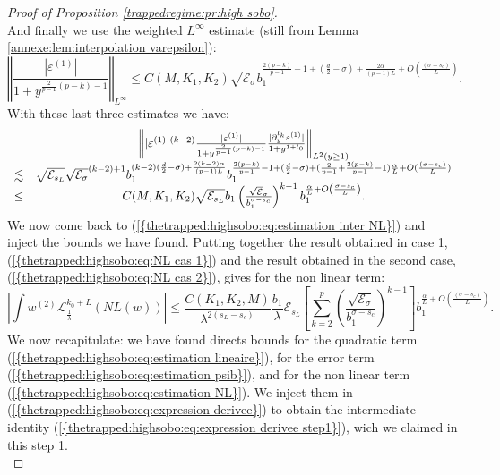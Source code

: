 \documentclass[11pt,a4paper,reqno]{amsart}
\theoremstyle{remark}
\numberwithin{equation}{section}
\begin{document}
\begin{proof}[Proof of Proposition \ref{trappedregime:pr:high sobo}]
$$$$
And finally we use the weighted $L^{\infty}$ estimate (still from Lemma \ref{annexe:lem:interpolation varepsilon}):
$$
\left\Vert \frac{|\varepsilon^{(1)}|}{1+y^{\frac{2}{p-1}(p-k)-1}} \right\Vert_{L^{\infty}}\leq C(M,K_1,K_2) \sqrt{\mathcal{E}_{\sigma}}b_1^{\frac{2(p-k)}{p-1}-1+(\frac{d}{2}-\sigma)+\frac{2\alpha}{(p-1)L}+ O(\frac{(\sigma-s_c)}{L})} .
$$
With these last three estimates we have:
\begin{equation} \label{thetrapped:highsobo:eq:NL cas 2}
\begin{array}{r c l}
&\left\Vert|\varepsilon^{(1)}|^{(k-2)}\frac{|\varepsilon^{(1)}|}{1+y^{\frac{2}{p-1}(p-k)-1}}  \frac{|\partial_y^{l_k}\varepsilon^{(1)}|}{1+y^{1+l_0}} \right\Vert_{L^2(y\geq 1)} \\
\lesssim & \sqrt{\mathcal{E}_{s_L}} \sqrt{\mathcal{E}_{\sigma}}^{(k-2)+1}b_1^{(k-2)(\frac{d}{2}-\sigma)+\frac{2(k-2)\alpha}{(p-1)L}} b_1^{\frac{2(p-k)}{p-1}-1+(\frac{d}{2}-\sigma)+(\frac{2}{p-1}+\frac{2(p-k)}{p-1}-1)\frac{\alpha}{L} +O(\frac{(\sigma-s_c)}{L})} \\
\leq& C(M,K_1,K_2) \sqrt{\mathcal{E}_{s_L}}b_1 \left( \frac{\sqrt{\mathcal{E}}_{\sigma}}{b_1^{\sigma-s_c}}\right)^{k-1}b_1^{\frac{\alpha}{L}+O\left(\frac{\sigma-s_c}{L}\right)} .
\end{array}
\end{equation}
We now come back to {{\rm (\ref{{thetrapped:highsobo:eq:estimation inter NL}})}} and inject the bounds we have found. Putting together the result obtained in case 1, {{\rm (\ref{{thetrapped:highsobo:eq:NL cas 1}})}} and the result obtained in the second case, {{\rm (\ref{{thetrapped:highsobo:eq:NL cas 2}})}}, gives for the non linear term: 
\begin{equation} \label{thetrapped:highsobo:eq:estimation NL}
\left| \int w^{(2)}\mathcal{L}_{\frac{1}{\lambda}}^{k_0+L}(NL(w))\right|\leq \frac{C(K_1,K_2,M)}{\lambda^{2(s_L-s_c)}}\frac{b_1}{\lambda}\mathcal{E}_{s_L}\left[ \sum_{k=2}^{p} \left( \frac{\sqrt{\mathcal{E}_{\sigma}}}{b_1^{\sigma-s_c}}\right)^{k-1}\right] b_1^{\frac{\alpha}{L}+O(\frac{(\sigma-s_c)}{L})} .
\end{equation}
We now recapitulate: we have found directs bounds for the quadratic term {{\rm (\ref{{thetrapped:highsobo:eq:estimation lineaire}})}}, for the error term {{\rm (\ref{{thetrapped:highsobo:eq:estimation psib}})}}, and for the non linear term {{\rm (\ref{{thetrapped:highsobo:eq:estimation NL}})}}. We inject them in {{\rm (\ref{{thetrapped:highsobo:eq:expression derivee}})}} to obtain the intermediate identity {{\rm (\ref{{thetrapped:highsobo:eq:expression derivee step1}})}}, wich we claimed in this step 1.\\


\end{proof}
\end{document}
